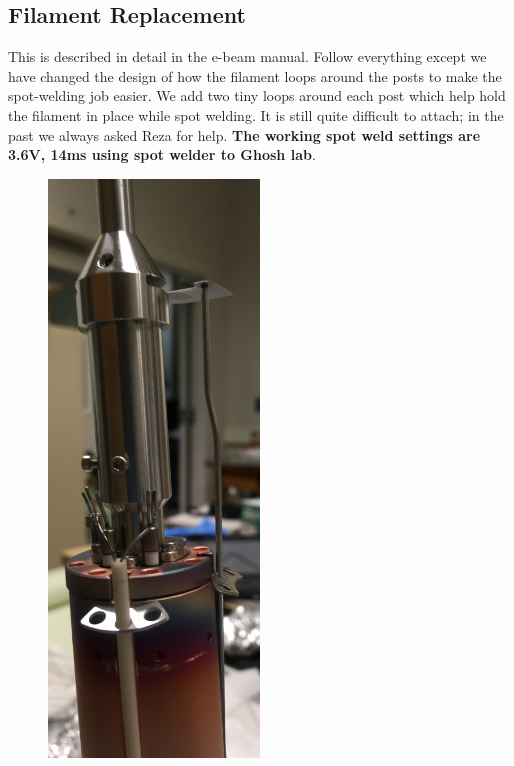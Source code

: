 \subsection{Filament Replacement}
This is described in detail in the e-beam manual. Follow everything except we have changed the design of how the filament loops around the posts to make the spot-welding job easier. We add two tiny loops around each post which help hold the filament in place while spot welding. It is still quite difficult to attach; in the past we always asked Reza for help. \textbf{The working spot weld settings are 3.6V, 14ms using spot welder to Ghosh lab}.
\begin{figure}[H]
\begin{minipage}[b]{0.33\linewidth}
	\centering
	\includegraphics[width=0.5\textwidth]{partially_dissasembled.jpg}
\end{minipage}\hfill
\begin{minipage}[b]{0.33\linewidth}

\end{minipage}
\end{figure}
